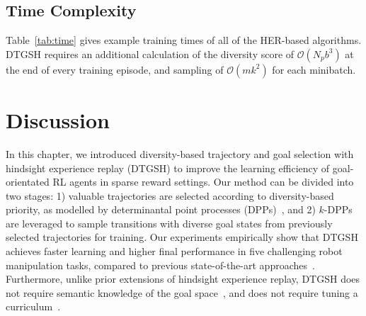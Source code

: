 \subsection{Time Complexity}
Table~\ref{tab:time} gives example training times of all of the HER-based algorithms. DTGSH requires an additional calculation of the diversity score of $\mathcal{O}(N_{p}b^3)$ at the end of every training episode, and sampling of $\mathcal{O}(mk^2)$ for each minibatch.
\begin{table}[h!]
    \centering
    \vspace{0.2em}
    \caption{Training time (hours:minutes:seconds) of DTGSH and baseline approaches on the Push task for 50 epochs.}
    \label{tab:time}
\end{table}

\section{Discussion}
In this chapter, we introduced diversity-based trajectory and goal selection with hindsight experience replay (DTGSH) to improve the learning efficiency of goal-orientated RL agents in sparse reward settings. Our method can be divided into two stages: 1) valuable trajectories are selected according to diversity-based priority, as modelled by determinantal point processes (DPPs)~\cite{kulesza2012determinantal}, and 2) $k$-DPPs~\cite{kulesza2011k} are leveraged to sample transitions with diverse goal states from previously selected trajectories for training. Our experiments empirically show that DTGSH achieves faster learning and higher final performance in five challenging robot manipulation tasks, compared to previous state-of-the-art approaches~\cite{andrychowicz2017hindsight,fang2019curriculum,zhao2018energy}. Furthermore, unlike prior extensions of hindsight experience replay, DTGSH does not require semantic knowledge of the goal space~\cite{zhao2018energy}, and does not require tuning a curriculum~\cite{fang2019curriculum}.